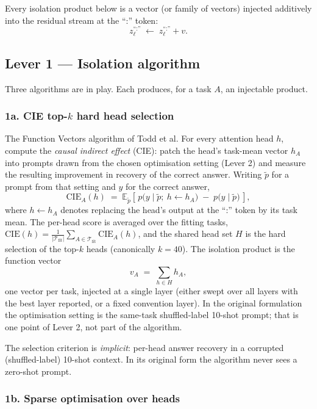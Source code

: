 \documentclass[
]{article}
\begin{document}
Every isolation product below is a vector (or family of vectors) injected additively
into the residual stream at the ``:'' token:
\[
z^{\text{``:''}}_\ell \;\leftarrow\; z^{\text{``:''}}_\ell + v. \tag{1}
\]

\subsection{Lever 1 — Isolation algorithm}\label{lever-1-isolation-algorithm}

Three algorithms are in play. Each produces, for a task \(A\), an injectable product.

\subsubsection{1a. CIE top-\texorpdfstring{\(k\)}{k} hard head selection}\label{lever-1a}

The Function Vectors algorithm of Todd et al. For every attention head \(h\), compute
the \emph{causal indirect effect} (CIE): patch the head's task-mean vector \(h_A\)
into prompts drawn from the chosen optimisation setting (Lever 2) and measure the
resulting improvement in recovery of the correct answer. Writing \(\tilde p\) for a
prompt from that setting and \(y\) for the correct answer,
\[
\mathrm{CIE}_A(h) \;=\; \mathbb{E}_{\tilde p}\!\left[\,
  p\big(y \mid \tilde p;\ h \leftarrow h_A\big) \;-\; p\big(y \mid \tilde p\big)
\,\right], \tag{2}
\]
where \(h \leftarrow h_A\) denotes replacing the head's output at the ``:'' token by
its task mean. The per-head score is averaged over the fitting tasks,
\(\mathrm{CIE}(h) = \frac{1}{|\mathcal{T}_{\mathrm{fit}}|}
\sum_{A \in \mathcal{T}_{\mathrm{fit}}} \mathrm{CIE}_A(h)\), and the shared head set
\(H\) is the hard selection of the top-\(k\) heads (canonically \(k = 40\)). The
isolation product is the function vector
\[
v_A \;=\; \sum_{h \in H} h_A, \tag{3}
\]
one vector per task, injected at a single layer (either swept over all layers with
the best layer reported, or a fixed convention layer). In the original formulation
the optimisation setting is the same-task shuffled-label 10-shot prompt; that is one
point of Lever 2, not part of the algorithm.

The selection criterion is \emph{implicit}: per-head answer recovery in a corrupted
(shuffled-label) 10-shot context. In its original form the algorithm never sees a
zero-shot prompt.

\subsubsection{1b. Sparse optimisation over heads}\label{lever-1b}
\end{document}
